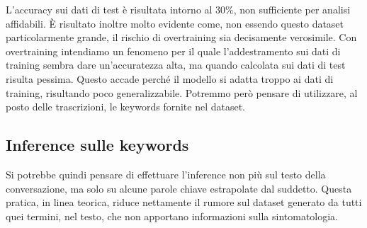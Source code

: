 L'accuracy sui dati di test è risultata intorno al $30\%$, non sufficiente per analisi affidabili. È risultato inoltre molto evidente come, non essendo questo dataset particolarmente grande, il rischio di overtraining sia decisamente verosimile. Con overtraining intendiamo un fenomeno per il quale l'addestramento sui dati di training sembra dare un'accuratezza alta, ma quando calcolata sui dati di test risulta pessima. Questo accade perché il modello si adatta troppo ai dati di training, risultando poco generalizzabile.
Potremmo però pensare di utilizzare, al posto delle trascrizioni, le keywords fornite nel dataset.
\subsection{Inference sulle keywords}
Si potrebbe quindi pensare di effettuare l'inference non più sul testo della conversazione, ma solo su alcune parole chiave estrapolate dal suddetto. Questa pratica, in linea teorica, riduce nettamente il rumore sul dataset generato da tutti quei termini, nel testo, che non apportano informazioni sulla sintomatologia.
